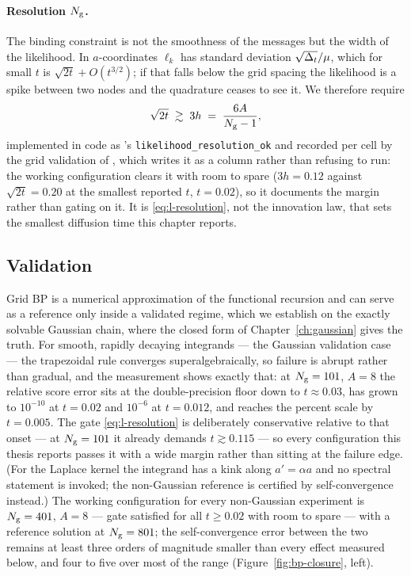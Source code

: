 \paragraph{Resolution $N_{\mathrm{g}}$.} The binding constraint is not the smoothness
of the messages but the width of the likelihood. In $a$-coordinates
$\ell_k$ has standard deviation $\sqrt{\Delta_t}/\mu$, which for small $t$ is
$\sqrt{2t} + O(t^{3/2})$; if that falls below the grid spacing the likelihood
is a spike between two nodes and the quadrature ceases to see it. We therefore
require
\begin{equation}
  \sqrt{2t} \;\gtrsim\; 3h \;=\; \frac{6A}{N_{\mathrm{g}} - 1},
  \label{eq:l-resolution}
\end{equation}
implemented in code as 's
\texttt{likelihood\_resolution\_ok} and recorded per cell by the grid
validation of , which writes it as a column rather than
refusing to run: the working configuration clears it with room to spare
($3h = 0.12$ against $\sqrt{2t} = 0.20$ at the smallest reported $t$,
$t = 0.02$), so it documents the margin rather than gating on it. It is
\eqref{eq:l-resolution}, not
the innovation law, that sets the smallest diffusion time this chapter reports.

\subsection{Validation}

Grid BP is a numerical approximation of the functional recursion and can serve
as a reference only inside a validated regime, which we establish on the
exactly solvable Gaussian chain, where the closed form of
Chapter~\ref{ch:gaussian} gives the truth. For smooth, rapidly decaying
integrands --- the Gaussian validation case --- the trapezoidal rule converges
superalgebraically, so failure is abrupt rather than gradual, and the
measurement shows exactly that: at $N_{\mathrm{g}} = 101$, $A = 8$ the relative score
error sits at the double-precision floor down to $t \approx 0.03$, has grown
to $10^{-10}$ at $t = 0.02$ and $10^{-6}$ at $t = 0.012$, and reaches the
percent scale by $t = 0.005$. The gate \eqref{eq:l-resolution} is deliberately
conservative relative to that onset --- at $N_{\mathrm{g}} = 101$ it already demands
$t \gtrsim 0.115$ --- so every configuration this thesis reports passes it
with a wide margin rather than sitting at the failure edge. (For the Laplace
kernel the integrand has a kink along $a' = \alpha a$ and no spectral
statement is invoked; the non-Gaussian reference is certified by
self-convergence instead.) The working configuration for every
non-Gaussian experiment is $N_{\mathrm{g}} = 401$, $A = 8$ --- gate satisfied for all
$t \geq 0.02$ with room to spare --- with a reference solution
at $N_{\mathrm{g}} = 801$; the self-convergence error between the two remains at
least three orders of magnitude smaller than every effect measured below,
and four to five over most of the range (Figure~\ref{fig:bp-closure}, left).

